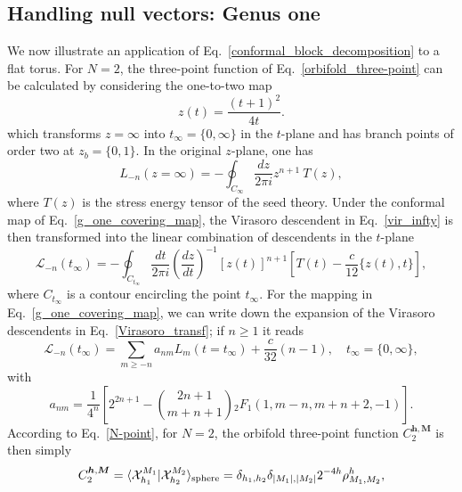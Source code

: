 \documentclass[a4paper,11pt]{article}
\begin{document}
\subsection{Handling null vectors: Genus one}
We now illustrate an application of Eq.~\eqref{conformal_block_decomposition} to a flat torus. For $N=2$, the three-point function of Eq.~\eqref{orbifold_three-point} 
can be calculated by considering the  one-to-two map
\begin{equation}\label{g_one_covering_map}
 z(t)=\frac{(t+1)^2}{4t}.
\end{equation}
which transforms $z=\infty$ into $t_{\infty}=\{0,\infty\}$
in the $t$-plane and has branch points of order two at $z_b=\{0,1\}$. In the original $z$-plane, one has
\begin{equation}
\label{vir_infty}
 L_{-n}(z=\infty)=-\oint_{C_{\infty}}\frac{dz}{2\pi i}z^{n+1}~T(z),
\end{equation}
where $T(z)$ is the stress energy tensor of the seed theory. Under the conformal map of
Eq.~\eqref{g_one_covering_map}, the Virasoro descendent in Eq.~\eqref{vir_infty}
is then transformed into the linear combination of descendents in the $t$-plane
\begin{equation}\label{Virasoro_transf}
 \mathcal{L}_{-n}(t_{\infty})=-\oint_{C_{t_{\infty}}}\frac{dt}{2\pi i}
 \left(\frac{dz}{dt}\right)^{-1}[z(t)]^{n+1}
 \left[T(t)-\frac{c}{12}\{z(t), t\}\right],
\end{equation}
where $C_{t_{\infty}}$ is a contour encircling the point $t_{\infty}$. For the mapping in Eq.~\eqref{g_one_covering_map}, 
we can write down  the expansion of the Virasoro descendents in Eq.~\eqref{Virasoro_transf};
if $n\geq 1$ it reads
\begin{equation}
\label{g1_1}
 \mathcal{L}_{-n}(t_{\infty})=\sum_{m\geq -n} a_{nm} L_{m}(t=t_{\infty})+\frac{c}{32}(n-1), \quad t_{\infty}=\{0,\infty\},
\end{equation}
with
\begin{equation}
\label{g1_2}
 a_{nm}=\frac{1}{4^n}\left[2^{2n+1}-\binom{2n+1}{m+n+1}{}_2F_1(1, m-n, m+n+2, -1)\right].
\end{equation}
According to Eq.~\eqref{N-point}, for $N=2$, the orbifold three-point function
$C_2^{\boldsymbol{h},\boldsymbol{M}}$ is then simply
\begin{equation}\label{C_2_X}
 C_2^{\boldsymbol{h},\boldsymbol{M}}=\langle \mathcal{X}_{h_1}^{M_1} | \mathcal{X}_{h_2}^{M_2}\rangle_{\rm{sphere}}=
 \delta_{h_1, h_2}\delta_{|M_1|,|M_2|}2^{-4h}\rho^h_{M_1,M_2},
\end{equation}
\end{document}
